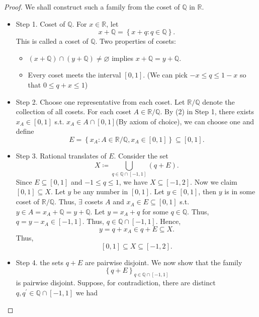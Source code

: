 \begin{proof}
    We shall construct such a family from the coset of \(\mathbb{Q} \) in \(\mathbb{R} \). 
    \begin{itemize}
        \item Step 1. Coset of \(\mathbb{Q} \). For \(x \in \mathbb{R} \), let 
        \[
            x + \mathbb{Q} = \left\{ x + q : q \in \mathbb{Q} \right\}. 
        \]
        This is called a coset of \(\mathbb{Q} \). Two properties of cosets:
        \begin{itemize}
            \item [(1)] \((x + \mathbb{Q} ) \cap (y + \mathbb{Q} ) \neq \varnothing\) implies \(x + \mathbb{Q} = y + \mathbb{Q} \).  
            \item [(2)] Every coset meets the interval \([0, 1]\). (We can pick \(-x \le q \le 1 - x\) so that \(0 \le q + x \le 1\)) 
        \end{itemize} 
        \item Step 2. Choose one representative from each coset. Let \(\mathbb{R} / \mathbb{Q} \) denote the collection of all cosets. For each coset \(A \in \mathbb{R} / \mathbb{Q} \). By (2) in Step 1, there exists \(x_A \in [0, 1]\) s.t. \(x_A \in A \cap [0, 1]\)(By axiom of choice), we can choose one and define 
        \[
            E = \left\{ x_A : A \in \mathbb{R} / \mathbb{Q} , x_A \in [0, 1] \right\} \subseteq [0, 1]. 
        \]
        \item Step 3. Rational translates of \(E\). Consider the set 
        \[
            X \coloneqq \bigcup_{q \in \mathbb{Q} \cap [-1, 1]} (q + E). 
        \]
        Since \(E \subseteq [0, 1]\) and \(-1 \le q \le 1\), we have \(X \subseteq [-1, 2]\). Now we claim \([0, 1] \subseteq X\). Let \(y\) be any number in \([0, 1]\). Let \(y \in [0, 1]\), then \(y\) is in some coset of \(\mathbb{R} / \mathbb{Q} \). Thus, \(\exists \) cosets \(A\) and \(x_A \in E \subseteq [0, 1]\) s.t. \(y \in A = x_A + \mathbb{Q} = y + \mathbb{Q} \). Let \(y = x_A + q\) for some \(q \in \mathbb{Q}\). Thus, \(q = y - x_A \in [-1, 1]\). Thus, \(q \in \mathbb{Q} \cap [-1, 1]\). Hence,
        \[
            y = q + x_A \in q + E \subseteq X.
        \]               
        Thus, 
        \[
            [0, 1] \subseteq X \subseteq [-1, 2].
        \]
        \item Step 4. the sets \(q + E\) are pairwise disjoint. We now show that the family 
        \[
            \left\{ q + E  \right\}_{q \in \mathbb{Q} \cap [-1, 1]} 
        \]
        is pairwise disjoint. Suppose, for contradiction, there are distinct \(q, q^{\prime} \in \mathbb{Q} \cap [-1, 1]\) we had

\end{itemize}
\end{proof}
